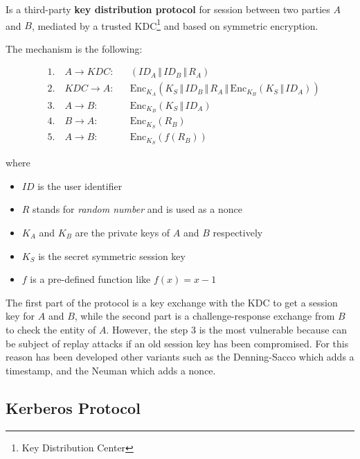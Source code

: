 \documentclass[oneside]{academica}
\begin{document}
Is a third-party \textbf{key distribution protocol} for session between two parties $A$ and $B$, mediated by a trusted KDC\footnote{Key Distribution Center} and based on symmetric encryption.

The mechanism is the following:

\begin{minipage}{0.8\textwidth}
  \vspace{-10pt}
  \begin{align*}
    & 1. \quad A \rightarrow KDC: & & \left( ID_A \,\Vert\, ID_B \,\Vert\, R_A \right) \\
    & 2. \quad KDC \rightarrow A: & & \text{Enc}_{K_A} \left( K_S \,\Vert\, ID_B \,\Vert\, R_A \,\Vert\, \text{Enc}_{K_B} \left( K_S \,\Vert\, ID_A \right) \right) \\
    & 3. \quad A \rightarrow B: & & \text{Enc}_{K_B} \left( K_S \,\Vert\, ID_A \right) \\
    & 4. \quad B \rightarrow A: & & \text{Enc}_{K_S} \left( R_B \right) \\
    & 5. \quad A \rightarrow B: & & \text{Enc}_{K_S} \left( f(R_B) \right)
  \end{align*}
\end{minipage}

\vspace{10pt}
where
\begin{itemize}
  \item $ID$ is the user identifier
  \item $R$ stands for \textit{random number} and is used as a nonce
  \item $K_A$ and $K_B$ are the private keys of $A$ and $B$ respectively
  \item $K_S$ is the secret symmetric session key
  \item $f$ is a pre-defined function like $f(x) = x-1$
\end{itemize}

The first part of the protocol is a key exchange with the KDC to get a session key for $A$ and $B$, while the second part is a challenge-response exchange from $B$ to check the entity of $A$.
However, the step 3 is the most vulnerable because can be subject of replay attacks if an old session key has been compromised.
For this reason has been developed other variants such as the Denning-Sacco which adds a timestamp, and the Neuman which adds a nonce.

\subsection{Kerberos Protocol}
\end{document}
